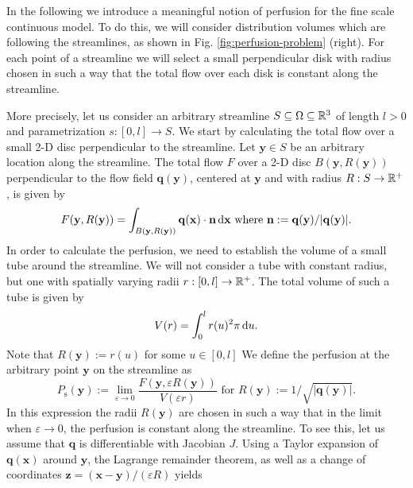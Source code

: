 \documentclass[journal,twocolumn]{IEEEtran}
\newcommand{\Perfs}{P_{\mathrm{s}}}
\newcommand{\vq}{\mathbf{q}}
\newcommand{\vx}{\mathbf{x}}
\newcommand{\vy}{\mathbf{y}}
\begin{document}
	In the following we introduce a meaningful notion of perfusion for the fine scale continuous model.
	To do this, we will consider distribution volumes which are following the streamlines, as shown in Fig. \ref{fig:perfusion-problem} (right). 	
	For each point of a streamline we will select a small perpendicular disk with radius chosen in such a way that the total flow over each disk is constant along the streamline.

	More precisely, let us consider an arbitrary streamline $S \subseteq \Omega \subseteq \mathbb{R}^3$ of length $l>0$ and parametrization $s:[0,l] \to S$.
	We start by calculating the total flow over a small 2-D disc perpendicular to the streamline.
	Let $\vy \in S$ be an arbitrary location along the streamline. 
	The total flow $F$ over a 2-D disc $B(\vy,R(\vy))$ perpendicular to the flow field $\vq(\vy)$, centered at $\vy$ and with radius $R:S\to\mathbb{R}^+$, is given by
	\begin{equation}
		F(\vy,R(\vy)) = \int_{B(\vy,R(\vy))} \vq(\vx) \cdot \mathbf{n} \diffint \vx \text{ where }\mathbf{n} := \vq(\vy)/\vert \vq(\vy) \vert.
		\label{eq:Fdisc}
	\end{equation}
	In order to calculate the perfusion, we need to establish the volume of a small tube around the streamline.
	We will not consider a tube with constant radius, but one with spatially varying radii $r:[0,l] \to \mathbb{R}^+$.
	The total volume of such a tube is given by
	\begin{equation}
		V(r) = \int_0^l r(u)^2 \pi \,\mathrm{d} u.
	\end{equation}
        Note that $R(\vy):=r(u)$ for some $u \in [0,l]$
        We define the perfusion at the arbitrary point $\vy$ on the streamline as
	\begin{equation}
		\Perfs(\vy):=  \lim_{\varepsilon \to 0} \frac{F(\vy,\varepsilon R(\vy))}{V(\varepsilon r)} \text{ for } R(\vy):=1/\sqrt{\vert \vq(\vy) \vert}.
		\label{eq:perfusiondef}
	\end{equation}
	In this expression the radii $R(\vy)$ are chosen in such a way that in the limit when $\varepsilon \to 0$, the perfusion is constant along the streamline. 
	To see this, let us assume that $\vq$ is differentiable with Jacobian $J$.
	Using a Taylor expansion of $\vq(\vx)$ around $\vy$, the Lagrange remainder theorem, as well as a change of coordinates $\mathbf{z} = (\vx-\vy)/(\varepsilon R)$ yields 
\end{document}
